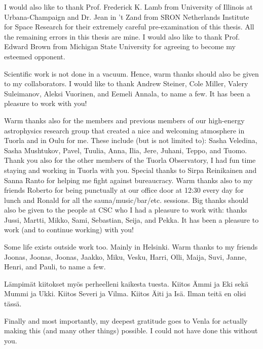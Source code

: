 I would also like to thank Prof. Frederick K. Lamb from University of Illinois at Urbana-Champaign and Dr. Jean in 't Zand from SRON Netherlands Institute for Space Research for their extremely careful pre-examination of this thesis.
All the remaining errors in this thesis are mine.
I would also like to thank Prof. Edward Brown from Michigan State University for agreeing to become my esteemed opponent.

 
Scientific work is not done in a vacuum.
Hence, warm thanks should also be given to my collaborators.
I would like to thank Andrew Steiner, Cole Miller, Valery Suleimanov, Aleksi Vuorinen, and Eemeli Annala, to name a few.
It has been a pleasure to work with you!
 


 
Warm thanks also for the members and previous members of our high-energy astrophysics research group that created a nice and welcoming atmosphere in Tuorla and in Oulu for me.
These include (but is not limited to): Sasha Veledina, Sasha Mushtukov, Pavel, Tuulia, Anna, Ilia, Jere, Juhani, Teppo, and Tuomo.
Thank you also for the other members of the Tuorla Observatory, I had fun time staying and working in Tuorla with you.
Special thanks to Sirpa Reinikainen and Sanna Ranto for helping me fight against bureaucracy.
Warm thanks also to my friends Roberto for being punctually at our office door at 12:30 every day for lunch and Ronald for all the sauna/music/bar/etc. sessions.
Big thanks should also be given to the people at CSC who I had a pleasure to work with: 
thanks Jussi, Martti, Mikko, Sami, Sebastian, Seija, and Pekka. 
It has been a pleasure to work (and to continue working) with you!
 
 
 
Some life exists outside work too. 
Mainly in Helsinki.
Warm thanks to my friends Joonas, Joonas, Joonas, Jaakko, Miku, Vesku, Harri, Olli, Maija, Suvi, Janne, Henri, and Pauli, to name a few.


%
%

Lämpimät kiitokset myös perheelleni kaikesta tuesta.
Kiitos Ämmi ja Eki sekä Mummi ja Ukki. 
Kiitos Severi ja Vilma.
Kiitos Äiti ja Isä.
Ilman teitä en olisi tässä.

Finally and most importantly, my deepest gratitude goes to Venla for actually making this (and many other things) possible. I could not have done this without you.
